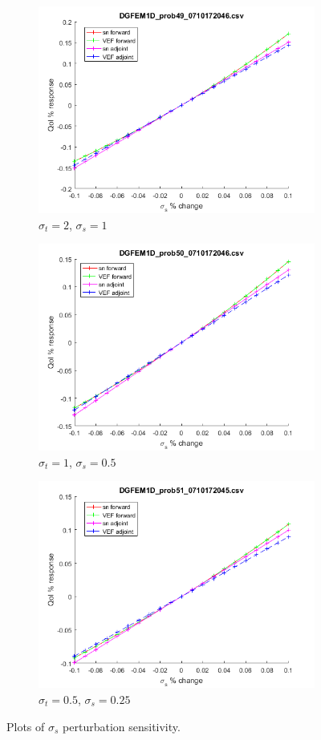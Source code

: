 \documentclass{article}
\newcommand{\sigt}{\sigma_t}
\newcommand{\sigs}{\sigma_s}
\begin{document}
\begin{figure}[H]
\label{InHomoPerts}
\centering
\begin{subfigure}{.5\textwidth}
  \centering
  \includegraphics[width=.8\linewidth]{figures/49sigsSens.png}
  \caption{$\sigt=2$, $\sigs=1$}
  \label{fig:sfig1}
\end{subfigure}%
\begin{subfigure}{.5\textwidth}
  \centering
  \includegraphics[width=.8\linewidth]{figures/50sigsSens.png}
  \caption{$\sigt=1$, $\sigs=0.5$}
  \label{fig:sfig2}
\end{subfigure}
\begin{subfigure}{.5\textwidth}
  \centering
  \includegraphics[width=.8\linewidth]{figures/51sigsSens.png}
  \caption{$\sigt=0.5$, $\sigs=0.25$}
  \label{fig:sfig3}
\end{subfigure}
\caption{Plots of $\sigs$ perturbation sensitivity.}
\label{fig:fig}
\end{figure}
\end{document}
